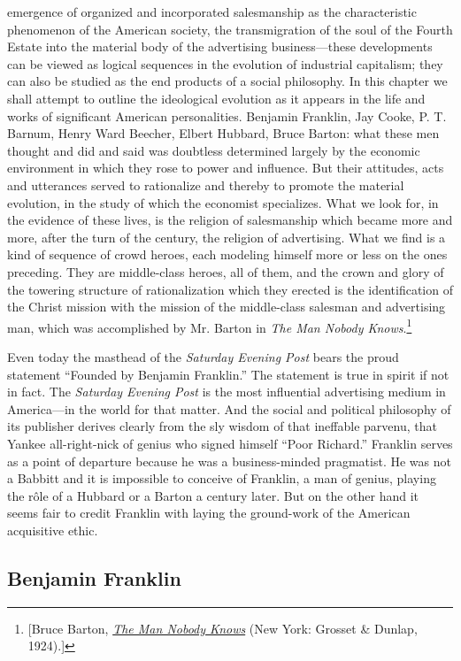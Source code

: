 \documentclass[nohyper,openany,nobib]{tufte-book}
\begin{document}
 emergence of organized and incorporated salesmanship as the
characteristic phenomenon of the American society, the transmigration of
the soul of the Fourth Estate into the material body of the advertising
business---these developments can be viewed as logical sequences in the
evolution of industrial capitalism; they can also be studied as the end
products of a social philosophy. In this chapter we shall attempt to
outline the ideological evolution as it appears in the life and works of
significant American personalities. Benjamin Franklin, Jay Cooke, P. T.
Barnum, Henry Ward Beecher, Elbert Hubbard, Bruce Barton: what these men
thought and did and said was doubtless determined largely by the
economic environment in which they rose to power and influence. But
their attitudes, acts and utterances served to rationalize and thereby
to promote the material evolution, in the study of which the economist
specializes. What we look for, in the evidence of these lives, is the
religion of salesmanship which became more and more, after the turn of
the century, the religion of advertising. What we find is a kind of
sequence of crowd heroes, each modeling himself more or less on the ones
preceding. They are middle-class heroes, all of them, and the crown and
glory of the towering structure of rationalization which they erected is
the identification of the Christ mission with the mission of the
middle-class salesman and advertising man, which was accomplished by Mr.
Barton in \emph{The Man Nobody Knows}.\footnote{{[}Bruce Barton,
  \emph{\href{http://www.worldcat.org/oclc/70421692}{The Man Nobody
  Knows}} (New York: Grosset \& Dunlap, 1924).{]}}

Even today the masthead of the \emph{Saturday Evening Post} bears the
proud statement ``Founded by Benjamin Franklin.'' The statement is true
in spirit if not in fact. The \emph{Saturday Evening Post} is the most
influential advertising medium in America---in the world for that
matter. And the social and political philosophy of its publisher derives
clearly from the sly wisdom of that ineffable parvenu, that Yankee
all-right-nick of genius who signed himself ``Poor Richard.'' Franklin
serves as a point of departure because he was a business-minded
pragmatist. He was not a Babbitt and it is impossible to conceive of
Franklin, a man of genius, playing the r\^ole of a Hubbard or a Barton a
century later. But on the other hand it seems fair to credit Franklin
with laying the ground-work of the American acquisitive ethic.

\subsection{Benjamin Franklin}
\end{document}
